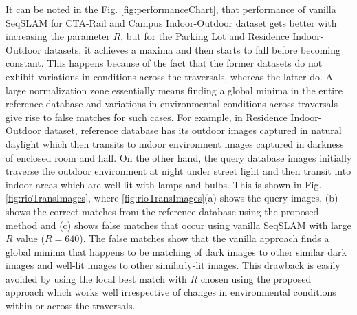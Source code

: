 \documentclass[letterpaper, 10 pt, conference]{ieeeconf}  %
\begin{document}
It can be noted in the Fig. \ref{fig:performanceChart}, that performance of vanilla SeqSLAM for CTA-Rail and Campus Indoor-Outdoor dataset gets better with increasing the parameter $R$, but for the Parking Lot and Residence Indoor-Outdoor datasets, it achieves a maxima and then starts to fall before becoming constant. This happens because of the fact that the former datasets do not exhibit variations in conditions across the traversals, whereas the latter do. A large normalization zone essentially means finding a global minima in the entire reference database and variations in environmental conditions across traversals give rise to false matches for such cases. For example, in Residence Indoor-Outdoor dataset, reference database has its outdoor images captured in natural daylight which then transits to indoor environment images captured in darkness of enclosed room and hall. On the other hand, the query database images initially traverse the outdoor environment at night under street light and then transit into indoor areas which are well lit with lamps and bulbs. This is shown in Fig. \ref{fig:rioTransImages}, where \ref{fig:rioTransImages}(a) shows the query images, (b) shows the correct matches from the reference database using the proposed method and (c) shows false matches that occur using vanilla SeqSLAM with large $R$ value ($R=640$). The false matches show that the vanilla approach finds a global minima that happens to be matching of dark images to other similar dark images and well-lit images to other similarly-lit images. This drawback is easily avoided by using the local best match with $R$ chosen using the proposed approach which works well irrespective of changes in environmental conditions within or across the traversals.

\newcommand{\imgW}{2.5cm}
\newcommand{\imgH}{1.4cm}
\end{document}
